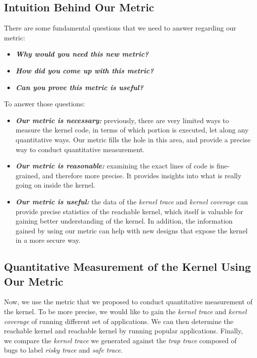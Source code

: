 \subsection{Intuition Behind Our Metric}
There are some fundamental questions that we need to answer regarding our metric:
\begin{itemize}
\item \textbf{\textit{Why would you need this new metric?}}
\item \textbf{\textit{How did you come up with this metric?}}
\item \textbf{\textit{Can you prove this metric is useful?}}
\end{itemize}

To answer those questions:
\begin{itemize}
\item \textbf{\textit{Our metric is necessary:}} previously, there are very limited ways to measure the kernel
code, in terms of which portion is executed, let along any quantitative ways. Our metric fills the hole in this 
area, and provide a precise way to conduct quantitative measurement.
\item \textbf{\textit{Our metric is reasonable:}} examining the exact lines of code is fine-grained, and therefore
more precise. It provides insights into what is really going on inside the kernel. 
\item \textbf{\textit{Our metric is useful:}} the data of the \textit{kernel trace} and \textit{kernel coverage}
can provide precise statistics of the reachable kernel, which itself is valuable for gaining better understanding
of the kernel. In addition, the information gained by using our metric can help with new designs that expose 
the kernel in a more secure way. 
\end{itemize}

\subsection{Quantitative Measurement of the Kernel Using Our Metric}
Now, we use the metric that we proposed to conduct quantitative measurement of the kernel. 
To be more precise, we would like to gain the \textit{kernel trace} and \textit{kernel coverage} of running 
different set of applications. We can then determine the reachable kernel and reachable kernel by 
running popular applications. Finally, we compare the \textit{kernel trace} we generated against the 
\textit{trap trace} composed of bugs to label \textit{risky trace} and \textit{safe trace}. 

